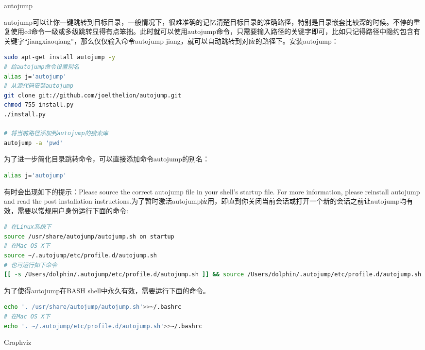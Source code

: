 \documentclass[12pt]{book}
\makeatletter
\numberwithin{dummy}{section}
\theoremstyle{ocrenumbox}
\theoremstyle{blacknumex}
\theoremstyle{blacknumbox}
\theoremstyle{ocrenum}
\renewcommand{\section}{\@startsection{section}{1}{\z@}
	{-4ex \@plus -1ex \@minus -.4ex}
	{1ex \@plus.2ex }
	{\normalfont\large\sffamily\bfseries}}
\renewcommand{\subsection}{\@startsection {subsection}{2}{\z@}
	{-3ex \@plus -0.1ex \@minus -.4ex}
	{0.5ex \@plus.2ex }
	{\normalfont\sffamily\bfseries}}
\makeatother
\begin{document}
\subsection{autojump}

autojump可以让你一键跳转到目标目录，一般情况下，很难准确的记忆清楚目标目录的准确路径，特别是目录嵌套比较深的时候。不停的重复使用cd命令一级或多级跳转显得有点笨拙。此时就可以使用autojump命令，只需要输入路径的关键字即可，比如只记得路径中隐约包含有关键字“jiangxiaoqiang”，那么仅仅输入命令autojump jiang，就可以自动跳转到对应的路径下。安装autojump：

\begin{lstlisting}[language=Bash]
sudo apt-get install autojump -y
# 给autojump命令设置别名
alias j='autojump'
# 从源代码安装autojump
git clone git://github.com/joelthelion/autojump.git
chmod 755 install.py
./install.py

# 将当前路径添加到autojump的搜索库
autojump -a 'pwd'
\end{lstlisting}

为了进一步简化目录跳转命令，可以直接添加命令autojump的别名：

\begin{lstlisting}[language=Bash]
alias j='autojump'
\end{lstlisting}

有时会出现如下的提示：Please source the correct autojump file in your shell's startup file. For more information, please reinstall autojump and read the post installation instructions.为了暂时激活autojump应用，即直到你关闭当前会话或打开一个新的会话之前让autojump均有效，需要以常规用户身份运行下面的命令:

\begin{lstlisting}[language=Bash]
# 在Linux系统下
source /usr/share/autojump/autojump.sh on startup
# 在Mac OS X下
source ~/.autojump/etc/profile.d/autojump.sh
# 也可运行如下命令
[[ -s /Users/dolphin/.autojump/etc/profile.d/autojump.sh ]] && source /Users/dolphin/.autojump/etc/profile.d/autojump.sh
\end{lstlisting}

为了使得autojump在BASH shell中永久有效，需要运行下面的命令。

\begin{lstlisting}[language=Bash]
echo '. /usr/share/autojump/autojump.sh'>>~/.bashrc
# 在Mac OS X下
echo '. ~/.autojump/etc/profile.d/autojump.sh'>>~/.bashrc
\end{lstlisting}

\section{Graphviz}
\end{document}
